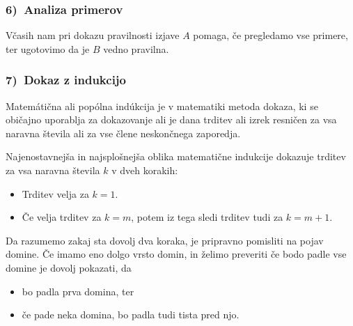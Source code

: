 \documentclass[11pt,paper=b5,DIV=13,headinclude,footinclude]{scrbook}
\begin{document}
\subsubsection*{6)~Analiza primerov}
Včasih nam pri dokazu pravilnosti izjave $A$ pomaga, če pregledamo vse primere, ter ugotovimo da je $B$ vedno pravilna.


\begin{center}
\end{center}
\subsubsection*{7)~Dokaz z indukcijo}

Matemátična ali popólna indúkcija je v matematiki metoda dokaza, ki se običajno uporablja za dokazovanje ali je dana trditev ali izrek resničen za vsa naravna števila ali za vse člene neskončnega zaporedja. 

Najenostavnejša in najsplošnejša oblika matematične indukcije dokazuje trditev za vsa naravna števila $k$ v dveh korakih:

\begin{itemize}
    \item Trditev velja za $k = 1$.
    \item  Če velja trditev za $k = m$, potem iz tega sledi trditev tudi za $k = m + 1$.
\end{itemize}
Da razumemo zakaj sta dovolj dva koraka, je pripravno pomisliti na pojav domine. Če imamo eno dolgo vrsto domin, in želimo preveriti če bodo  padle vse domine  je dovolj pokazati, da
\begin{itemize}
    \item bo padla prva domina, ter
    \item če pade neka domina, bo padla tudi tista pred njo. 
\end{itemize}
\end{document}
